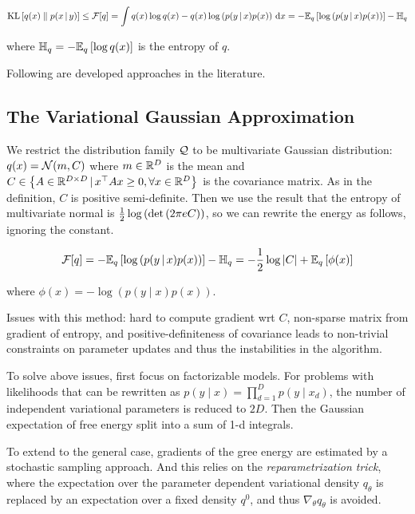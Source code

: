 \documentclass{article}
\begin{document}
\begin{equation}
    \operatorname*{KL}\left[ q(x)\parallel p(x\,|\, y) \right] \leq \mathcal{F}[q]=\int q(x) \log q(x)-q(x)\log\left( p(y\,|\, x)p(x) \right)\,\mathrm{d} x=-\mathbb{E}_q\left[ \log\left( p(y\,|\, x)p(x) \right) \right]-\mathbb{H}_q
\end{equation}

where \(\mathbb{H}_q = -\mathbb{E}_q\left[ \log q(x) \right]\) is the entropy of \(q\). 

Following are developed approaches in the literature.

\subsection{The Variational Gaussian Approximation}

We restrict the distribution family \(\mathcal{Q}\) to be multivariate Gaussian distribution: \(q(x)=\mathcal{N}(m,C)\) where \(m\in \mathbb{R}^D\) is the mean and \(C\in\left\{ A\in\mathbb{R}^{D\times D} \,|\, x^\top A x\geq 0, \forall x\in\mathbb{R}^D \right\}\) is the covariance matrix. As in the definition, \(C\) is positive semi-definite. Then we use the result that the entropy of multivariate normal is \(\frac{1}{2}\log\left( \det\left( 2\pi e C \right) \right)\), so we can rewrite the energy as follows, ignoring the constant.

\begin{equation}
    \mathcal{F}[q]=-\mathbb{E}_q\left[ \log\left( p(y\,|\, x)p(x) \right) \right]-\mathbb{H}_q=-\frac{1}{2}\log\left\vert C\right\vert+\mathbb{E}_q\left[ \phi(x) \right]
\end{equation}

where \(\phi(x)=-\log(p(y\mid x)p(x))\).

Issues with this method: hard to compute gradient wrt \(C\), non-sparse matrix from gradient of entropy, and positive-definiteness of covariance leads to non-trivial constraints on parameter updates and thus the instabilities in the algorithm.

To solve above issues, first focus on factorizable models. For problems with likelihoods that can be rewritten as \(p(y\mid x)=\prod_{d=1}^D p(y\mid x_d)\), the number of independent variational parameters is reduced to \(2D\). Then the Gaussian expectation of free energy split into a sum of 1-d integrals. 

To extend to the general case, gradients of the gree energy are estimated by a stochastic sampling approach. And this relies on the \emph{reparametrization trick}, where the expectation over the parameter dependent variational density \(q_\theta\) is replaced by an expectation over a fixed density \(q^0\), and thus \(\nabla_\theta q_\theta\) is avoided.
\end{document}
